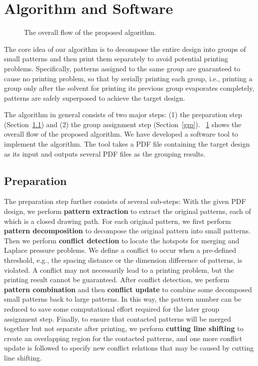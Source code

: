 \section{Algorithm and Software}\label{sec:method}

\begin{figure}[t]
	\fontsize{11}{11}  \selectfont
	\centerline{\resizebox{8.5cm}{!}{}}
	\caption{The overall flow of the proposed algorithm.}
	\label{fig:flow}
	\normalsize
\end{figure}

The core idea of our algorithm is to decompose the entire design into groups of small patterns and then print them separately to avoid potential printing problems.
Specifically,
patterns assigned to the same group are guaranteed to cause no printing problem,
so that by serially printing each group,
i.e., printing a group only after the solvent for printing its previous group evaporates completely,
patterns are safely superposed to achieve the target design.

The algorithm in general consists of two major steps:
(1) the preparation step (Section~\ref{prep}) and (2) the group assignment step (Section~\ref{gro}).
\figurename~\ref{fig:flow} shows the overall flow of the proposed algorithm.
We have developed a software tool to implement the algorithm.
The tool takes a PDF file containing the target design as its input
and outputs several PDF files as the grouping results.
 
 
\subsection{Preparation}\label{prep}

The preparation step further consists of several sub-steps:
With the given PDF design,
we perform \textbf{pattern extraction} to extract the original patterns,
each of which is a closed drawing path.
For each original pattern,
we first perform \textbf{pattern decomposition} to decompose the original pattern into small patterns.
Then we perform \textbf{conflict detection} to locate the hotspots for merging and Laplace pressure problems.
We define a conflict to occur when a pre-defined threshold,
e.g., the spacing distance or the dimension difference of patterns, is violated.
A conflict may not necessarily lead to a printing problem,
but the printing result cannot be guaranteed.
After conflict detection,
we perform \textbf{pattern combination} and then \textbf{conflict update} to combine some decomposed small patterns back to large patterns.
In this way,
the pattern number can be reduced to save some computational effort required for the later group assignment step.
Finally, to ensure that contacted patterns will be merged together but not separate after printing,
we perform \textbf{cutting line shifting} to create an overlapping region for the contacted patterns,
and one more conflict update is followed to specify new conflict relations that may be caused by cutting line shifting.

